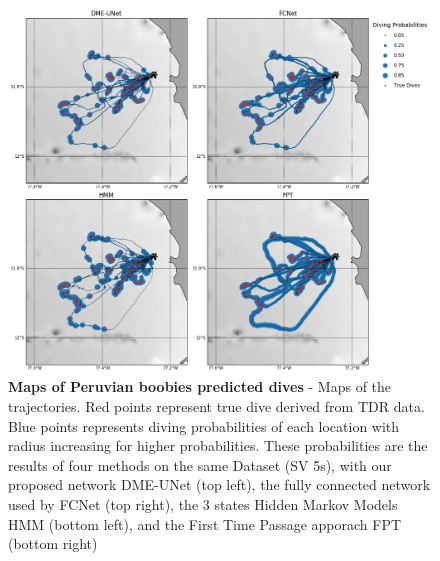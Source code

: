 \documentclass{article}
\begin{document}
\begin{figure}[h]
  \centering
  \includegraphics[scale=0.5]{figure4a.png}
  \caption{\textbf{Maps of Peruvian boobies predicted dives} - Maps of the trajectories. Red points represent true dive derived from TDR data. Blue points represents diving probabilities of each location with radius increasing for higher probabilities. These probabilities are the results of four methods on the same Dataset (SV 5s), with our proposed network DME-UNet (top left), the fully connected network used by \cite{browning_predicting_2018}  FCNet (top right), the 3 states Hidden Markov Models HMM (bottom left), and the First Time Passage apporach FPT (bottom right)}
  \label{figure4a}
\end{figure}
\end{document}
